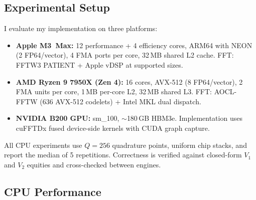 \documentclass[11pt]{article}
\begin{document}
\subsection{Experimental Setup}

I evaluate my implementation on three platforms:
\begin{itemize}
  \item \textbf{Apple M3~Max:} 12 performance + 4 efficiency cores,
    ARM64 with NEON (2 FP64/vector), 4 FMA ports per core,
    32\,MB shared L2 cache. FFT: FFTW3 PATIENT + Apple vDSP at
    supported sizes.
  \item \textbf{AMD Ryzen 9 7950X (Zen 4):} 16 cores,
    AVX-512 (8 FP64/vector), 2 FMA units per core,
    1\,MB per-core L2, 32\,MB shared L3. FFT: AOCL-FFTW (636 AVX-512
    codelets) + Intel MKL dual dispatch.
  \item \textbf{NVIDIA B200 GPU:} sm\_100, ${\sim}$180\,GB HBM3e.
    Implementation uses cuFFTDx fused device-side kernels with
    CUDA graph capture.
\end{itemize}

All CPU experiments use $Q = 256$ quadrature points, uniform chip stacks,
and report the median of 5 repetitions. Correctness is verified against
closed-form $V_1$ and $V_2$ equities and cross-checked between engines.

\subsection{CPU Performance}
\end{document}
